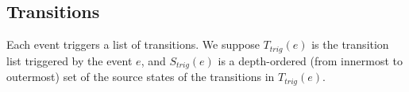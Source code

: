 
\subsection{Transitions}

Each event triggers a list of transitions. 
We suppose $T_{trig}(e)$ is the transition list triggered by the event $e$, and $S_{trig}(e)$ is a depth-ordered (from innermost to outermost) set of the source states of the transitions in $T_{trig}(e)$. 

